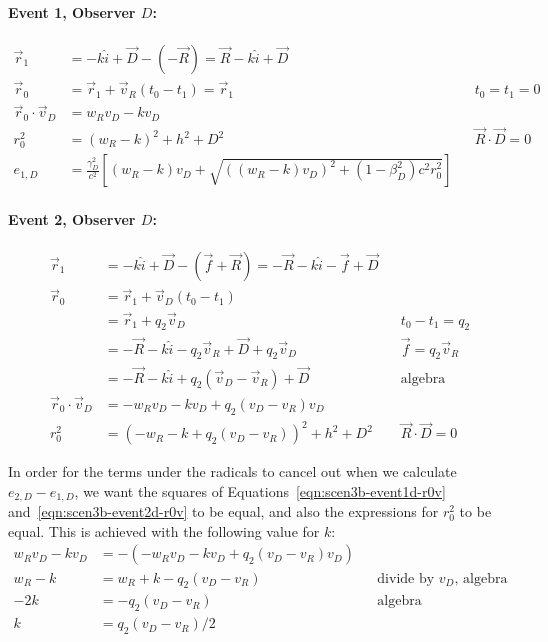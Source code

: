 \documentclass[a4paper]{article}
\theoremstyle{plain}
\theoremstyle{definition}
\newcommand{\vect}[1]{\vec{#1}}
\newcommand{\hatvec}[1]{\hat{#1}}
\newcommand{\ihat}{\hatvec{i}}
\begin{document}
\paragraph{Event 1, Observer $D$:}

\begin{align}
\vect{r}_1 & = -k\ihat + \vect{D} - (-\vect{R}) = \vect{R} - k\ihat + \vect{D} \nonumber \\
\vect{r}_0 & = \vect{r}_1 + \vect{v}_R (t_0 - t_1) = \vect{r}_1 & & \text{$t_0=t_1=0$} \nonumber \\
\vect{r}_0 \cdot \vect{v}_D & = w_Rv_D - kv_D \label{eqn:scen3b-event1d-r0v} \\
r_0^2 & = (w_R-k)^2 + h^2 + D^2 & & \text{$\vect{R} \cdot \vect{D} = 0$} \nonumber \\
e_{1,D} & = \frac{\gamma_D^2}{c^2} \left[ (w_R-k)v_D + \sqrt{ ((w_R-k)v_D)^2 + (1-\beta_D^2)c^2r_0^2 } \right] \nonumber
\end{align}


\paragraph{Event 2, Observer $D$:}

\begin{align}
\vect{r}_1 & = -k\ihat + \vect{D} - (\vect{f} + \vect{R}) = -\vect{R} - k\ihat - \vect{f} + \vect{D} \nonumber \\
\vect{r}_0
  & = \vect{r}_1 + \vect{v}_D (t_0 - t_1) \nonumber \\
  & = \vect{r}_1 + q_2 \vect{v}_D & & \text{$t_0 - t_1 = q_2$} \nonumber \\
  & = - \vect{R} - k\ihat - q_2\vect{v}_R + \vect{D} + q_2 \vect{v}_D & & \text{$\vect{f} = q_2 \vect{v}_R$} \nonumber \\
  & = - \vect{R} - k\ihat + q_2 (\vect{v}_D - \vect{v}_R) + \vect{D} & & \text{algebra} \nonumber \\
\vect{r}_0 \cdot \vect{v}_D & = - w_Rv_D - kv_D + q_2(v_D-v_R)v_D \label{eqn:scen3b-event2d-r0v} \\
r_0^2
  & = (-w_R - k + q_2(v_D-v_R))^2 + h^2 + D^2 & & \text{$\vect{R} \cdot \vect{D} = 0$} \nonumber
\end{align}

In order for the terms under the radicals to cancel out when we
calculate $e_{2,D} - e_{1,D}$, we want
the squares of Equations~\eqref{eqn:scen3b-event1d-r0v}
and~\eqref{eqn:scen3b-event2d-r0v} to be equal, and also the
expressions for $r_0^2$ to be equal.
This is achieved with the following value for $k$:
\begin{align*}
w_Rv_D - kv_D & = -(- w_Rv_D - kv_D + q_2(v_D-v_R)v_D) \\
w_R - k & = w_R + k - q_2(v_D-v_R) & & \text{divide by $v_D$, algebra} \\
-2k & = -q_2(v_D-v_R) & & \text{algebra} \\
k & = q_2(v_D-v_R)/2 \\
\end{align*}
\end{document}
